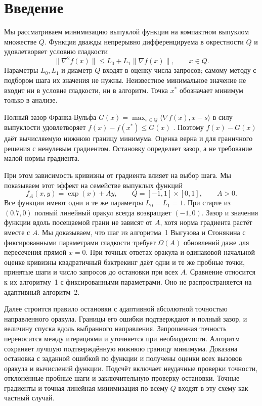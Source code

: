 \section{Введение}
\label{sec:intro}
Мы рассматриваем минимизацию выпуклой функции на компактном выпуклом
множестве $Q$. Функция дважды непрерывно дифференцируема в окрестности
$Q$ и удовлетворяет условию гладкости
\[
 \|\nabla^2 f(x)\|\le L_0+L_1\|\nabla f(x)\|,\qquad x\in Q.
\]
Параметры $L_0,L_1$ и диаметр $Q$ входят в оценку числа запросов;
самому методу с подбором шага их значения не нужны.
Неизвестное минимальное значение не входит ни в условие гладкости,
ни в алгоритм. Точка $x^*$ обозначает минимум только в анализе.

Полный зазор Франка-Вульфа
$G(x)=\max_{s\in Q}\langle\nabla f(x),x-s\rangle$
в силу выпуклости удовлетворяет
$f(x)-f(x^*)\le G(x)$ \cite{jaggi}.
Поэтому $f(x)-G(x)$ даёт вычисляемую нижнюю границу минимума.
Оценка верна и для граничного решения с ненулевым градиентом.
Остановку определяет зазор, а не требование малой нормы градиента.

При этом зависимость кривизны от градиента влияет на выбор шага.
Мы показываем этот эффект на семействе выпуклых функций
\[
 f_A(x,y)=\exp(x)+Ay,\qquad
 Q=[-1,1]\times[0,1],\qquad A>0.
\]
Все функции имеют одни и те же параметры $L_0=L_1=1$.
При старте из $(0.7,0)$ полный линейный оракул всегда возвращает
$(-1,0)$. Зазор и значения функции вдоль посещаемой грани не зависят
от $A$, хотя норма градиента растёт вместе с $A$.
Мы доказываем, что шаг из алгоритма~1 Выгузова и Стонякина
\cite{vyguzov} с фиксированными параметрами гладкости требует
$\Omega(A)$ обновлений даже для пересечения прямой $x=0$.
При точных ответах оракула и одинаковой начальной оценке кривизны
квадратичный бэктрекинг даёт одни и те же пробные точки, принятые
шаги и число запросов до остановки при всех $A$.
Сравнение относится к их алгоритму~1 с фиксированными параметрами.
Оно не распространяется на адаптивный алгоритм~2.

Далее строится правило остановки с адаптивной абсолютной точностью
направленного оракула. Границы его ошибки подтверждают и полный
зазор, и величину спуска вдоль выбранного направления.
Запрошенная точность переносится между итерациями и уточняется при
необходимости. Алгоритм сохраняет лучшую подтверждённую нижнюю
границу минимума. Доказана остановка с заданной ошибкой по функции
и получены оценки всех вызовов оракула и вычислений функции.
Подсчёт включает неудачные проверки точности, отклонённые пробные
шаги и заключительную проверку остановки. Точные градиенты и точная
линейная минимизация по всему $Q$ входят в эту схему как частный случай.

